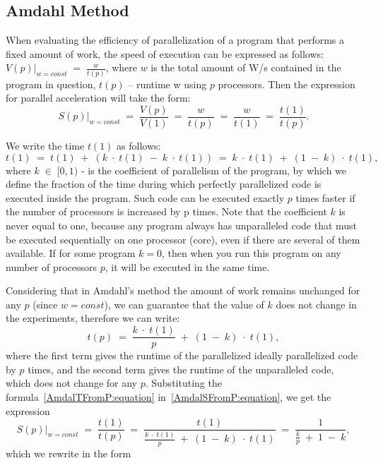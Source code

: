 { %
	\subsection{Amdahl Method}
	\par When evaluating the efficiency of parallelization of a program that performs a fixed amount of work, the speed of execution can be expressed as follows:$\left.V(p)\right|_{w=const}\;=\;\frac w{t(p)}$, where $w$  is the total amount of W/s contained in the program in question, $t(p)$ – runtime w using $ p $ processors. Then the expression for parallel acceleration will take the form:
	\begin{equation}
		\label{AmdalSFromP:equation}
		\left.S(p)\right|_{w=const}\;=\;\frac{V(p)}{V(1)}\;=\;\frac w{t(p)}\;=\;\frac w{t(1)}\;=\;\frac{t(1)}{t(p)}.
	\end{equation}
	\par We write the time $t(1)$ as follows:
	\begin{equation}
		t(1)\;=\;t(1)\;+\;(k\;\cdot\;t(1)\;-\;k\;\cdot\;t(1))\;=\;k\;\cdot\;t(1)\;+\;(1\;-\;k)\;\cdot\;t(1),
	\end{equation}
	where $k\;\in\;\lbrack0,1)$ - is the coefficient of parallelism of the program, by which we define the fraction of the time during which perfectly parallelized code is executed inside the program. Such code can be executed exactly $p$ times faster if the number of processors is increased by p times. Note that the coefficient $k$ is never equal to one, because any program always has unparalleled code that must be executed sequentially on one processor (core), even if there are several of them available. If for some program $k =0 $, then when you run this program on any number of processors $p$, it will be executed in the same time.
	\par Considering that in Amdahl’s method the amount of work remains unchanged for any $p$ (since $w = const$), we can guarantee that the value of $ k $ does not change in the experiments, therefore we can write:
	\begin{equation}
		\label{AmdalTFromP:equation}
		t(p)\;=\;\frac{k\;\cdot\;t(1)}p\;+\;(1\;-\;k)\;\cdot\;t(1),
	\end{equation}
where the first term gives the runtime of the parallelized ideally parallelized code by $p$ times, and the second term gives the runtime of the unparalleled code, which does not change for any $p$. Substituting the formula~\eqref{AmdalTFromP:equation} in~\eqref{AmdalSFromP:equation}, we get the expression $$\left.S(p)\right|_{w=const}\;=\;\frac{t(1)}{t(p)}\;=\;\frac{t(1)}{{\displaystyle\frac{k\;\cdot\;t(1)}p}\;+\;(1\;-\;k)\;\cdot\;t(1)}\;=\;\frac1{{\displaystyle\frac kp}\;+\;1\;-\;k},$$ which we rewrite in the form
}
